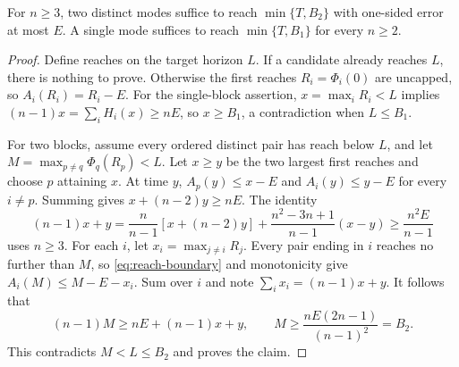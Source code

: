 \begin{lemma}\label{lem:reach-two}
For $n\ge3$, two distinct modes suffice to reach $\min\{T,B_2\}$
with one-sided error at most $E$. A single mode suffices to reach
$\min\{T,B_1\}$ for every $n\ge2$.
\end{lemma}
\begin{proof}
Define reaches on the target horizon $L$. If a candidate already reaches
$L$, there is nothing to prove. Otherwise the first reaches
$R_i=\Phi_i(0)$ are uncapped, so $A_i(R_i)=R_i-E$.
For the single-block assertion, $x=\max_iR_i<L$ implies
$(n-1)x=\sum_iH_i(x)\ge nE$, so $x\ge B_1$, a contradiction
when $L\le B_1$.

For two blocks, assume every ordered distinct pair has reach below $L$,
and let $M=\max_{p\ne q}\Phi_q(R_p)<L$. Let $x\ge y$ be the
two largest first reaches and choose $p$ attaining $x$. At time $y$,
$A_p(y)\le x-E$ and $A_i(y)\le y-E$ for every $i\ne p$.
Summing gives $x+(n-2)y\ge nE$. The identity
\begin{equation}\label{eq:first-reach-pair}
 (n-1)x+y=\frac{n}{n-1}[x+(n-2)y]
 +\frac{n^2-3n+1}{n-1}(x-y)
 \ge\frac{n^2E}{n-1}
\end{equation}
uses $n\ge3$. For each $i$, let $x_i=\max_{j\ne i}R_j$.
Every pair ending in $i$ reaches no further than $M$, so
\eqref{eq:reach-boundary} and monotonicity give
$A_i(M)\le M-E-x_i$. Sum over $i$ and note
$\sum_i x_i=(n-1)x+y$. It follows that
\begin{equation}\label{eq:global-pair-bound}
 (n-1)M\ge nE+(n-1)x+y,
 \qquad M\ge\frac{nE(2n-1)}{(n-1)^2}=B_2.
\end{equation}
This contradicts $M<L\le B_2$ and proves the claim.
\end{proof}

